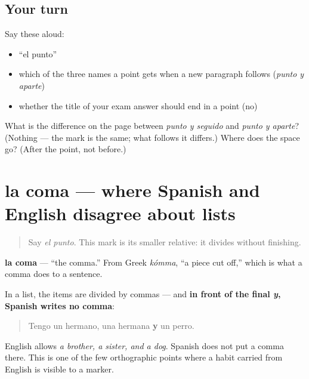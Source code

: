 \subsection*{Your turn}
Say these aloud:

\begin{itemize}
\raggedright
  \item \textquotedblleft{}el punto\textquotedblright{}
  \item which of the three names a point gets when a new paragraph follows (\emph{punto y aparte})
  \item whether the title of your exam answer should end in a point (no)
\end{itemize}

\begin{tcolorbox}[breakable,colback=teal!4,colframe=teal!35!black,title={Before you move on}]
What is the difference on the page between \emph{punto y seguido} and \emph{punto y aparte}? (Nothing — the mark is the same; what follows it differs.) Where does the space go? (After the point, not before.)
\end{tcolorbox}
\section[la coma]{la coma — where Spanish and English disagree about lists}

\label{lesson:ES-C424-coma}



\begin{quote}
Say \emph{el punto}. This mark is its smaller relative: it divides without finishing.
\end{quote}

\begin{cousinweb}
\textbf{la coma} — \textquotedblleft{}the comma.\textquotedblright{} From Greek \emph{kómma}, \textquotedblleft{}a piece cut off,\textquotedblright{} which is what a comma does to a sentence.

In a list, the items are divided by commas — and \textbf{in front of the final \emph{y}, Spanish writes no comma}:

\begin{quote}
Tengo un hermano, una hermana \textbf{y} un perro.
\end{quote}

English allows \emph{a brother, a sister, and a dog}. Spanish does not put a comma there. This is one of the few orthographic points where a habit carried from English is visible to a marker.
\end{cousinweb}

